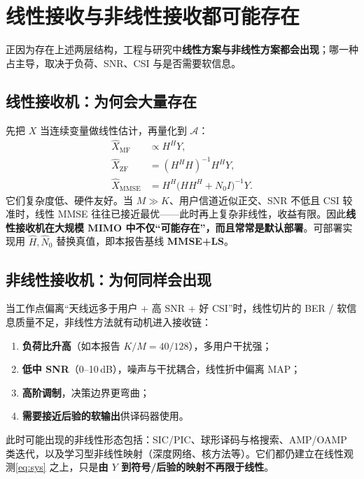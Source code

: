 \begin{center}
\end{center}

\section{线性接收与非线性接收都可能存在}

正因为存在上述两层结构，工程与研究中\textbf{线性方案与非线性方案都会出现}；哪一种占主导，取决于负荷、SNR、CSI 与是否需要软信息。

\subsection{线性接收机：为何会大量存在}
先把 $X$ 当连续变量做线性估计，再量化到 $\mathcal{A}$：
\begin{align}
\hat X_{\mathrm{MF}} &\propto H^H Y,\\
\hat X_{\mathrm{ZF}} &= (H^H H)^{-1}H^H Y,\\
\hat X_{\mathrm{MMSE}} &= H^H\big(H H^H+N_0 I\big)^{-1} Y.
\end{align}
它们复杂度低、硬件友好。当 $M\gg K$、用户信道近似正交、SNR 不低且 CSI 较准时，线性 MMSE 往往已接近最优\cite{hoydis2013,larsson2014}——此时再上复杂非线性，收益有限。因此\textbf{线性接收机在大规模 MIMO 中不仅“可能存在”，而且常常是默认部署}。可部署实现用 $\hat H,\hat N_0$ 替换真值，即本报告基线 \textbf{MMSE+LS}。

\subsection{非线性接收机：为何同样会出现}
当工作点偏离“天线远多于用户 + 高 SNR + 好 CSI”时，线性切片的 BER / 软信息质量不足，非线性方法就有动机进入接收链：
\begin{enumerate}[leftmargin=2em]
  \item \textbf{负荷比升高}（如本报告 $K/M=40/128$），多用户干扰强；
  \item \textbf{低中 SNR}（0--10\,dB），噪声与干扰耦合，线性折中偏离 MAP；
  \item \textbf{高阶调制}，决策边界更弯曲；
  \item \textbf{需要接近后验的软输出}供译码器使用。
\end{enumerate}
此时可能出现的非线性形态包括：SIC/PIC、球形译码与格搜索、AMP/OAMP 类迭代，以及学习型非线性映射（深度网络、核方法等）。它们都仍建立在线性观测\eqref{eq:sys} 之上，只是\textbf{由 $Y$ 到符号/后验的映射不再限于线性}。


